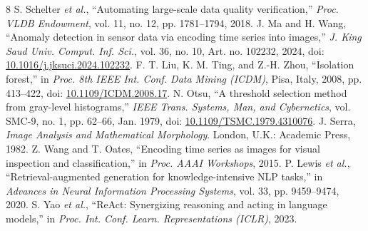 \documentclass[conference]{IEEEtran}
\begin{document}
\begin{thebibliography}{8}\footnotesize
{} S. Schelter \textit{et al.}, ``Automating large-scale data quality verification,'' \emph{Proc. VLDB Endowment}, vol. 11, no. 12, pp. 1781--1794, 2018.
 J. Ma and H. Wang, ``Anomaly detection in sensor data via encoding time series into images,'' \emph{J. King Saud Univ. Comput. Inf. Sci.}, vol. 36, no. 10, Art. no. 102232, 2024, doi: \url{10.1016/j.jksuci.2024.102232}.
 F. T. Liu, K. M. Ting, and Z.-H. Zhou, ``Isolation forest,'' in \emph{Proc. 8th IEEE Int. Conf. Data Mining (ICDM)}, Pisa, Italy, 2008, pp. 413--422, doi: \url{10.1109/ICDM.2008.17}.
 N. Otsu, ``A threshold selection method from gray-level histograms,'' \emph{IEEE Trans. Systems, Man, and Cybernetics}, vol. SMC-9, no. 1, pp. 62--66, Jan. 1979, doi: \url{10.1109/TSMC.1979.4310076}.
 J. Serra, \emph{Image Analysis and Mathematical Morphology}. London, U.K.: Academic Press, 1982.
 Z. Wang and T. Oates, ``Encoding time series as images for visual inspection and classification,'' in \emph{Proc. AAAI Workshops}, 2015.
 P. Lewis \textit{et al.}, ``Retrieval-augmented generation for knowledge-intensive NLP tasks,'' in \emph{Advances in Neural Information Processing Systems}, vol. 33, pp. 9459--9474, 2020.
 S. Yao \textit{et al.}, ``ReAct: Synergizing reasoning and acting in language models,'' in \emph{Proc. Int. Conf. Learn. Representations (ICLR)}, 2023.
\end{thebibliography}
\end{document}
